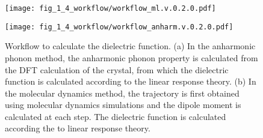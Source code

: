 \begin{figure}[htb]
 \centering
 \begin{subcaptionblock}{\linewidth}
  \subcaption{}\label{fig:workflow:1}
  \texttt{[image: fig\_1\_4\_workflow/workflow\_ml.v.0.2.0.pdf]}
\end{subcaptionblock}
 \begin{subcaptionblock}{\linewidth}
  \subcaption{}\label{fig:workflow:2}
  \texttt{[image: fig\_1\_4\_workflow/workflow\_anharm.v.0.2.0.pdf]}
\end{subcaptionblock}
  \caption{Workflow to calculate the dielectric function. (a) In the anharmonic phonon method, the anharmonic phonon property is calculated from the DFT calculation of the crystal, from which the dielectric function is calculated according to the linear response theory. (b) In the molecular dynamics method, the trajectory is first obtained using molecular dynamics simulations and the dipole moment is calculated at each step. The dielectric function is calculated according the to linear response theory.}
\label{Fig:workflow}
\end{figure}

